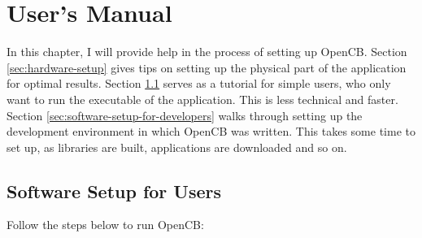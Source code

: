 \chapter{User's Manual} \label{ch:users-manual} \pagestyle{fancy}

In this chapter, I will provide help in the process of setting up OpenCB. Section \ref{sec:hardware-setup} gives tips on setting up the physical part of the application for optimal results. Section \ref{sec:software-setup-for-users} serves as a tutorial for simple users, who only want to run the executable of the application. This is less technical and faster. Section \ref{sec:software-setup-for-developers} walks through setting up the development environment in which OpenCB was written. This takes some time to set up, as libraries are built, applications are downloaded and so on.




\section{Software Setup for Users} \label{sec:software-setup-for-users}

Follow the steps below to run OpenCB:

